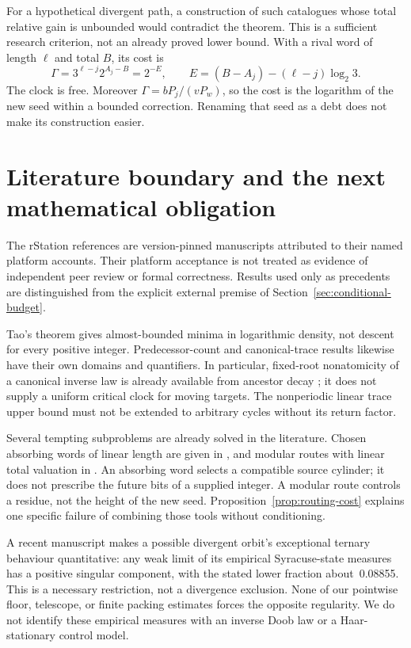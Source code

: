 \documentclass[11pt,a4paper]{article}
\theoremstyle{definition}
\begin{document}
For a hypothetical divergent path, a construction of such catalogues
whose total relative gain is unbounded would contradict the theorem.
This is a sufficient research criterion, not an already proved lower
bound. With a rival word of length $\ell$ and total $B$, its cost is
\[
 \Gamma=3^{\ell-j}2^{A_j-B}=2^{-E},\qquad
 E=(B-A_j)-(\ell-j)\log_2 3.
\]
The clock is free. Moreover $\Gamma=bP_j/(vP_w)$, so the cost is
the logarithm of the new seed within a bounded correction. Renaming
that seed as a debt does not make its construction easier.



\section{Literature boundary and the next mathematical obligation}
\label{sec:next}
The rStation references are version-pinned manuscripts attributed to
their named platform accounts. Their platform acceptance is not treated
as evidence of independent peer review or formal correctness. Results
used only as precedents are distinguished from the explicit external
premise of Section~\ref{sec:conditional-budget}.

Tao's theorem \cite{tao2022} gives almost-bounded minima in logarithmic
density, not descent for every positive integer. Predecessor-count
and canonical-trace results likewise have their own domains and
quantifiers. In particular, fixed-root nonatomicity of a canonical
inverse law is already available from ancestor decay
\cite{valbuena2026,weaver12}; it does not supply a uniform critical
clock for moving targets. The nonperiodic linear trace upper bound
must not be extended to arbitrary cycles without its return factor.

Several tempting subproblems are already solved in the literature.
Chosen absorbing words of linear length are given in
\cite{weaver81}, and modular routes with linear total valuation in
\cite{weaver48}. An absorbing word selects a compatible source
cylinder; it does not prescribe the future bits of a supplied
integer. A modular route controls a residue, not the height of the
new seed. Proposition~\ref{prop:routing-cost} explains one specific
failure of combining those tools without conditioning.

A recent manuscript \cite{weaver150} makes a possible divergent
orbit's exceptional ternary behaviour quantitative: any weak limit
of its empirical Syracuse-state measures has a positive singular
component, with the stated lower fraction about~0.08855. This is a
necessary restriction, not a divergence exclusion. None of our
pointwise floor, telescope, or finite packing estimates forces the
opposite regularity. We do not identify these empirical measures
with an inverse Doob law or a Haar-stationary control model.
\end{document}
